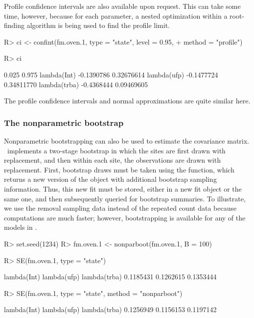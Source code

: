 \documentclass[article,shortnames]{jss}
\newcommand{\um}{\pkg{unmarked}}
\begin{document}
{Profile confidence intervals are also available upon request.  This
can take some time, however, because for each parameter, a nested
optimization within a root-finding algorithm is being used to find the
profile limit.

\begin{Schunk}
\begin{Sinput}
R> ci <- confint(fm.oven.1, type = "state", level = 0.95, 
+     method = "profile")
\end{Sinput}
\end{Schunk}
\begin{Schunk}
\begin{Sinput}
R> ci
\end{Sinput}
\begin{Soutput}
                  0.025      0.975
lambda(Int)  -0.1390786 0.32676614
lambda(ufp)  -0.1477724 0.34811770
lambda(trba) -0.4368444 0.09469605
\end{Soutput}
\end{Schunk}

The profile confidence intervals and normal approximations are quite
similar here.

\subsubsection{The nonparametric bootstrap}

Nonparametric bootstrapping can also be used to estimate the
covariance matrix. \um\ implements a two-stage bootstrap in which the
 sites are first drawn with replacement, and then within each site, the
observations are drawn with replacement.  First, bootstrap draws must
be taken using the  function, which returns a new
version of the  object with additional bootstrap sampling
information.  Thus, this new fit must be stored, either in a new fit
object or the same one, and then subsequently queried for bootstrap
summaries.  To illustrate, we use the removal sampling data instead of the
repeated count data because computations are much faster; however,
bootstrapping is available for any of the models in \um.

\begin{Schunk}
\begin{Sinput}
R> set.seed(1234)
R> fm.oven.1 <- nonparboot(fm.oven.1, B = 100)
\end{Sinput}
\end{Schunk}

\begin{Schunk}
\begin{Sinput}
R> SE(fm.oven.1, type = "state")
\end{Sinput}
\begin{Soutput}
 lambda(Int)  lambda(ufp) lambda(trba) 
   0.1185431    0.1262615    0.1353444 
\end{Soutput}
\begin{Sinput}
R> SE(fm.oven.1, type = "state", method = "nonparboot")
\end{Sinput}
\begin{Soutput}
 lambda(Int)  lambda(ufp) lambda(trba) 
   0.1256949    0.1156153    0.1197142 
\end{Soutput}
\end{Schunk}

}
\end{document}
